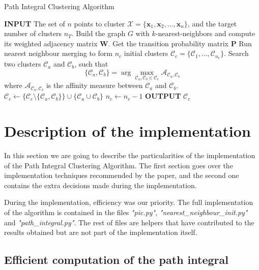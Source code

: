 \documentclass[
	10pt,
	parskip=half-,	
	paper=a4,
	english
	]{scrartcl}
\begin{document}
\begin{algorithm}
\caption{Path Integral Clustering Algorithm}
\begin{algorithmic}[1]
    \State \textbf{INPUT} The set of $n$ points to cluster $\mathcal{X} = \{\mathbf{x}_1, \mathbf{x}_2, \dots, \mathbf{x}_n\}$, and the target number of clusters $n_T$.
    \State Build the graph $G$ with $k$-nearest-neighbors and compute its weighted adjacency matrix $\mathbf{W}$.
    \State Get the transition probability matrix $\mathbf{P}$
    \State Run nearest neighbour merging to form $n_c$ initial clusters $\mathcal{C}_c = \{\mathcal{C}_1, \ldots, \mathcal{C}_{n_c}\}$.
        \State Search two clusters $\mathcal{C}_a$ and $\mathcal{C}_b$, such that 
        \[
        \{\mathcal{C}_a, \mathcal{C}_b\} = \arg\max_{\mathcal{C}_a, \mathcal{C}_b \in \mathcal{C}_c} \mathcal{A}_{\mathcal{C}_a, \mathcal{C}_b}
        \]
        where $\mathcal{A}_{\mathcal{C}_a, \mathcal{C}_b}$ is the affinity measure between $\mathcal{C}_a$ and $\mathcal{C}_b$.
        \State $\mathcal{C}_c \leftarrow \{\mathcal{C}_c \setminus \{\mathcal{C}_a, \mathcal{C}_b\} \} \cup \{\mathcal{C}_a \cup \mathcal{C}_b\}$
        \State $n_c \leftarrow n_c - 1$
    \EndWhile
    \State \textbf{OUTPUT} $\mathcal{C}_c$
\end{algorithmic}
\label{algorithmpseudo}
\end{algorithm}

\section {Description of the implementation}

In this section we are going to describe the particularities of the implementation of the Path Integral Clustering Algorithm. The first section goes over the implementation techniques recommended by the paper, and the second one contains the extra decisions made during the implementation. 

During the implementation, efficiency was our priority. The full implementation of the algorithm is contained in the files \textit{"pic.py"}, \textit{"nearest\_neighbour\_init.py"} and \textit{"path\_integral.py"}. The rest of files are helpers that have contributed to the results obtained but are not part of the implementation itself.

\subsection{Efficient computation of the path integral}
\end{document}
